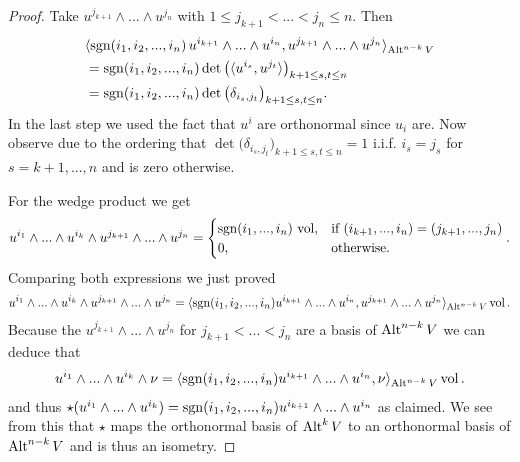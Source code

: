 \documentclass[../master_thesis.tex]{subfiles}
\begin{document}
\begin{proof}
    Take $u^{j_{k+1}} \wedge ... \wedge u^{j_n}$ with 
    $1 \leq j_{k+1} < ... < j_n \leq n$. Then 
    \begin{align*}
        &\langle \operatorname{sgn}(i_1,i_2,...,i_n) \, u^{i_{k+1}} \wedge ... \wedge u^{i_{n}},
            u^{j_{k+1}} \wedge ... \wedge u^{j_{n}} \rangle_{{\text{Alt}^{n-k}\,V}}
        \\ &= \operatorname{sgn}(i_1,i_2,...,i_n) \det \big( \langle u^{i_s}, u^{j_t} \rangle \big)_{k+1 \leq s,t \leq n}
        \\ &= \operatorname{sgn}(i_1,i_2,...,i_n) \det \big( \delta_{i_s,j_t} \big)_{k+1 \leq s,t \leq n}.
    \end{align*}
    In the last step we used the fact that $u^i$ are orthonormal since $u_i$ 
    are. Now observe due to the ordering that 
    $\det \big( \delta_{i_s,j_t} \big)_{k+1 \leq s,t \leq n} = 1$ i.i.f.
    $i_s = j_s$ for $s = k+1,...,n$ and is zero otherwise.

    For the wedge product we get
    \begin{align*}
        u^{i_1} \wedge ... \wedge u^{i_{k}} \wedge u^{j_{k+1}} \wedge ... 
            \wedge u^{j_n}
        =   \begin{cases}
                \operatorname{sgn}(i_1, ..., i_n)\, \operatorname{vol}, & \text{if $(i_{k+1},...,i_n) = (j_{k+1},...,j_n)$} \\
                0,  & \text{otherwise.}
            \end{cases}.
    \end{align*}
    Comparing both expressions we just proved
    \begin{align*}
        u^{i_1} \wedge ... \wedge u^{i_{k}} \wedge u^{j_{k+1}} \wedge ... \wedge u^{j_n}
        = \langle \operatorname{sgn}(i_1,i_2,...,i_n) u^{i_{k+1}} \wedge ... \wedge u^{i_{n}},
            u^{j_{k+1}} \wedge ... \wedge u^{j_{n}} \rangle_{{\text{Alt}^{n-k}\,V}} \operatorname{vol}.
    \end{align*}
    Because the $u^{j_{k+1}} \wedge ... \wedge u^{j_n}$ for $j_{k+1} < ... < j_n$ are a 
    basis of ${\text{Alt}^{n-k}\,V}$ we can deduce that 
    \begin{align*}
        u^{i_1} \wedge ... \wedge u^{i_{k}} \wedge \nu = \langle \operatorname{sgn}(i_1,i_2,...,i_n) u^{i_{k+1}} \wedge 
        ... \wedge u^{i_{n}}, \nu \rangle_{{\text{Alt}^{n-k}\,V}} \operatorname{vol}.
    \end{align*}
    and thus  
    $\star (u^{i_1} \wedge ... \wedge u^{i_{k}}) = 
    \operatorname{sgn}(i_1,i_2,...,i_n) u^{i_{k+1}} \wedge ... \wedge u^{i_{n}}$ as claimed.
    We see from this that $\star$ maps the orthonormal basis of ${\text{Alt}^{k}\,V}$ 
    to an orthonormal
    basis of ${\text{Alt}^{n-k}\,V}$ and is thus an isometry.


\end{proof}
\end{document}
